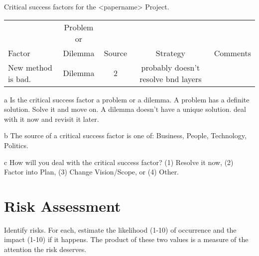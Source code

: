 \documentclass[11pt]{nmemo}
\begin{document}

\begin{center}
  \begin{threeparttable}
    \caption{Critical success factors for the <papername> Project.}
    \label{tab:critical-success}
    \begin{tabular}{|p{4.5cm}|c|c|c|p{4.5cm}|}
      \hline
      & Problem or        &  &  \\
      Factor             &  Dilemma\tnote{a} & Source\tnote{b} & Strategy\tnote{c} & Comments \\
      \hline\hline
      New method is bad. &  Dilemma   &    2
      & probably doesn't resolve bnd layers \\
      \hline
    \end{tabular}
    \begin{tablenotes}
    \item[a] \footnotesize{Is the critical success factor a problem or a
        dilemma.  A problem has a definite solution.  Solve it and move
        on.  A dilemma doesn't have a unique solution.  deal with it now
        and revisit it later.}
    \item[b] The source of a critical success factor is one of: Business,
      People, Technology, Politics.
    \item[c] \footnotesize{How will you deal with the critical success
        factor? (1) Resolve it now, (2) Factor into Plan, (3) Change
        Vision/Scope, or (4) Other.}
    \end{tablenotes}
  \end{threeparttable}
\end{center}

\newpage
\section*{Risk Assessment}

Identify risks.  For each, estimate the likelihood (1-10) of
occurrence and the impact (1-10) if it happens.  The product of these
two values is a measure of the attention the risk deserves.
\end{document}
